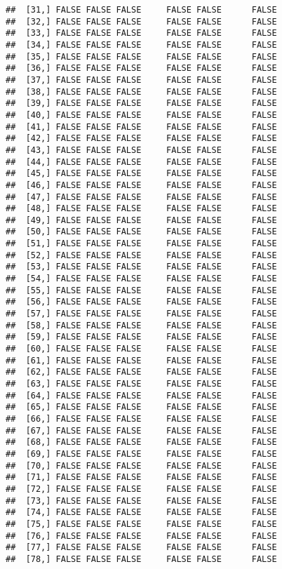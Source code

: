 \documentclass[
]{article}
\begin{document}
\begin{verbatim}
##  [31,] FALSE FALSE FALSE     FALSE FALSE      FALSE
##  [32,] FALSE FALSE FALSE     FALSE FALSE      FALSE
##  [33,] FALSE FALSE FALSE     FALSE FALSE      FALSE
##  [34,] FALSE FALSE FALSE     FALSE FALSE      FALSE
##  [35,] FALSE FALSE FALSE     FALSE FALSE      FALSE
##  [36,] FALSE FALSE FALSE     FALSE FALSE      FALSE
##  [37,] FALSE FALSE FALSE     FALSE FALSE      FALSE
##  [38,] FALSE FALSE FALSE     FALSE FALSE      FALSE
##  [39,] FALSE FALSE FALSE     FALSE FALSE      FALSE
##  [40,] FALSE FALSE FALSE     FALSE FALSE      FALSE
##  [41,] FALSE FALSE FALSE     FALSE FALSE      FALSE
##  [42,] FALSE FALSE FALSE     FALSE FALSE      FALSE
##  [43,] FALSE FALSE FALSE     FALSE FALSE      FALSE
##  [44,] FALSE FALSE FALSE     FALSE FALSE      FALSE
##  [45,] FALSE FALSE FALSE     FALSE FALSE      FALSE
##  [46,] FALSE FALSE FALSE     FALSE FALSE      FALSE
##  [47,] FALSE FALSE FALSE     FALSE FALSE      FALSE
##  [48,] FALSE FALSE FALSE     FALSE FALSE      FALSE
##  [49,] FALSE FALSE FALSE     FALSE FALSE      FALSE
##  [50,] FALSE FALSE FALSE     FALSE FALSE      FALSE
##  [51,] FALSE FALSE FALSE     FALSE FALSE      FALSE
##  [52,] FALSE FALSE FALSE     FALSE FALSE      FALSE
##  [53,] FALSE FALSE FALSE     FALSE FALSE      FALSE
##  [54,] FALSE FALSE FALSE     FALSE FALSE      FALSE
##  [55,] FALSE FALSE FALSE     FALSE FALSE      FALSE
##  [56,] FALSE FALSE FALSE     FALSE FALSE      FALSE
##  [57,] FALSE FALSE FALSE     FALSE FALSE      FALSE
##  [58,] FALSE FALSE FALSE     FALSE FALSE      FALSE
##  [59,] FALSE FALSE FALSE     FALSE FALSE      FALSE
##  [60,] FALSE FALSE FALSE     FALSE FALSE      FALSE
##  [61,] FALSE FALSE FALSE     FALSE FALSE      FALSE
##  [62,] FALSE FALSE FALSE     FALSE FALSE      FALSE
##  [63,] FALSE FALSE FALSE     FALSE FALSE      FALSE
##  [64,] FALSE FALSE FALSE     FALSE FALSE      FALSE
##  [65,] FALSE FALSE FALSE     FALSE FALSE      FALSE
##  [66,] FALSE FALSE FALSE     FALSE FALSE      FALSE
##  [67,] FALSE FALSE FALSE     FALSE FALSE      FALSE
##  [68,] FALSE FALSE FALSE     FALSE FALSE      FALSE
##  [69,] FALSE FALSE FALSE     FALSE FALSE      FALSE
##  [70,] FALSE FALSE FALSE     FALSE FALSE      FALSE
##  [71,] FALSE FALSE FALSE     FALSE FALSE      FALSE
##  [72,] FALSE FALSE FALSE     FALSE FALSE      FALSE
##  [73,] FALSE FALSE FALSE     FALSE FALSE      FALSE
##  [74,] FALSE FALSE FALSE     FALSE FALSE      FALSE
##  [75,] FALSE FALSE FALSE     FALSE FALSE      FALSE
##  [76,] FALSE FALSE FALSE     FALSE FALSE      FALSE
##  [77,] FALSE FALSE FALSE     FALSE FALSE      FALSE
##  [78,] FALSE FALSE FALSE     FALSE FALSE      FALSE

\end{verbatim}
\end{document}
